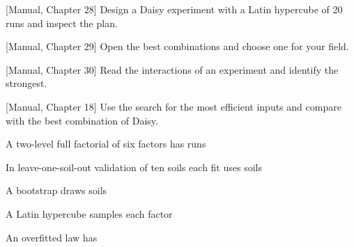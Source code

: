 \begin{exlist}
\item {\color{khblue}[Manual, Chapter 28]} Design a Daisy experiment with a Latin hypercube of 20 runs and inspect the plan.\par{}
\item {\color{khblue}[Manual, Chapter 29]} Open the best combinations and choose one for your field.\par{}
\item {\color{khblue}[Manual, Chapter 30]} Read the interactions of an experiment and identify the strongest.\par{}
\item {\color{khblue}[Manual, Chapter 18]} Use the search for the most efficient inputs and compare with the best combination of Daisy.\par{}
\end{exlist}
\begin{exlist}
\item A two-level full factorial of six factors has runs
\item In leave-one-soil-out validation of ten soils each fit uses soils
\item A bootstrap draws soils
\item A Latin hypercube samples each factor
\item An overfitted law has
\end{exlist}
